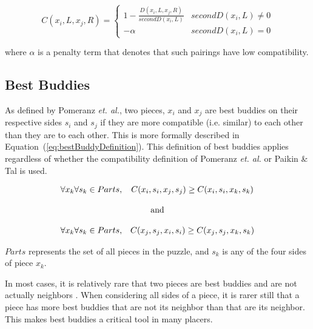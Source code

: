 \documentclass{report}
\def\eref#1{(\ref{#1})}
\begin{document}
\begin{equation} \label{eq:hammoudehAsymCompatibility}
C(x_i,L,x_j,R)= \begin{cases} 
	1 - \frac{D(x_i,L,x_j,R)}{secondD(x_i,L)} & secondD(x_i,L) \ne 0
\\
	-\alpha & secondD(x_i,L) = 0
\end{cases} 
\end{equation}

\noindent
where $\alpha$ is a penalty term that denotes that such pairings have low compatibility.


\subsection{Best Buddies}\label{sec:bestBuddies}

As defined by Pomeranz \textit{et. al.}, two pieces, $x_i$ and $x_j$ are best buddies on their respective sides $s_i$ and $s_j$ if they are more compatible (i.e. similar) to each other than they are to each other.  This is more formally described in Equation~\eref{eq:bestBuddyDefinition}.  This definition of best buddies applies regardless of whether the compatibility definition of Pomeranz \textit{et. al.} or Paikin \& Tal is used.

\begin{equation} \label{eq:bestBuddyDefinition}
\begin{split}
\begin{matrix}
\forall{x_k} \forall{s_k} \in Parts, & C(x_i, s_i, x_j, s_j) \geq C(x_i, s_i, x_k, s_k)
\\
\\
\multicolumn{2}{c}{\textnormal{and}}
\\
\\
\forall{x_k} \forall{s_k} \in Parts, & C(x_j, s_j, x_i, s_i) \geq C(x_j, s_j, x_k, s_k)
\end{matrix}
\end{split}
\end{equation}

\noindent
$Parts$ represents the set of all pieces in the puzzle, and $s_k$ is any of the four sides of piece $x_k$.

In most cases, it is relatively rare that two pieces are best buddies and are not actually neighbors \cite{paikin2015}.  When considering all sides of a piece, it is rarer still that a piece has more best buddies that are not its neighbor than that are its neighbor.  This makes best buddies a critical tool in many placers.
\end{document}
